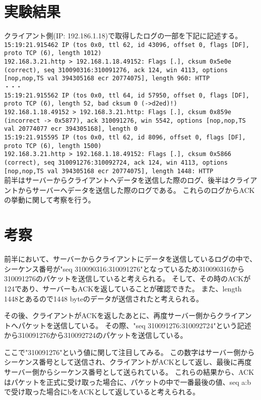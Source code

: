 \documentclass[twocolumn]{jsarticle}
\begin{document}
\section{実験結果}
クライアント側(IP: 192.186.1.18)で取得したログの一部を下記に記述する。\\
{\scriptsize \texttt{15:19:21.915462 IP (tos 0x0, ttl 62, id 43096, offset 0, flags [DF], proto TCP (6), length 1012)\\
  192.168.3.21.http > 192.168.1.18.49152: Flags [.], cksum 0x5e0e (correct), seq 310090316:310091276, ack 124, win 4113, options [nop,nop,TS val 394305168 ecr 20774075], length 960: HTTP\\
・・・\\
15:19:21.915562 IP (tos 0x0, ttl 64, id 57950, offset 0, flags [DF], proto TCP (6), length 52, bad cksum 0 (->d2ed)!)\\
  192.168.1.18.49152 > 192.168.3.21.http: Flags [.], cksum 0x859e (incorrect -> 0x5877), ack 310091276, win 5542, options [nop,nop,TS val 20774077 ecr 394305168], length 0\\
15:19:21.915595 IP (tos 0x0, ttl 62, id 8096, offset 0, flags [DF], proto TCP (6), length 1500)\\
  192.168.3.21.http > 192.168.1.18.49152: Flags [.], cksum 0x5866 (correct), seq 310091276:310092724, ack 124, win 4113, options [nop,nop,TS val 394305168 ecr 20774075], length 1448: HTTP\\
}}
前半はサーバーからクライアントへデータを送信した際のログ、後半はクライアントからサーバーへデータを送信した際のログである。
これらのログからACKの挙動に関して考察を行う。

\section{考察}
前半において、サーバーからクライアントにデータを送信しているログの中で、
シーケンス番号が"seq 310090316:310091276"となっているため310090316から310091276のパケットを送信していると考えられる。
そして、その時のACKが124であり、サーバーもACKを返していることが確認できた。
また、length 1448とあるので1448 byteのデータが送信されたと考えられる。

その後、クライアントがACKを返したあとに、再度サーバー側からクライアントへパケットを送信している。
その際、"seq 310091276:310092724"という記述から310091276から310092724のパケットを送信している。

ここで"310091276"という値に関して注目してみる。
この数字はサーバー側からシーケンス番号として送信され、クライアントがACKとして返し、最後に再度サーバー側からシーケンス番号として送られている。
これらの結果から、ACKはパケットを正式に受け取った場合に、パケットの中で一番最後の値、seq a:bで受け取った場合にbをACKとして返していると考えられる。
\end{document}
